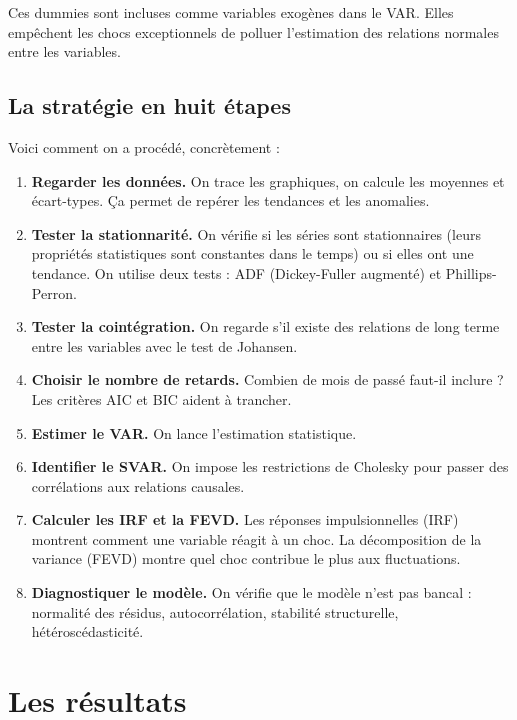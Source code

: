 \documentclass[12pt,a4paper]{article}
\begin{document}
Ces dummies sont incluses comme variables exogènes dans le VAR. Elles empêchent les chocs exceptionnels de polluer l'estimation des relations normales entre les variables.

\subsection{La stratégie en huit étapes}

Voici comment on a procédé, concrètement :

\begin{enumerate}
  \item \textbf{Regarder les données.} On trace les graphiques, on calcule les moyennes et écart-types. Ça permet de repérer les tendances et les anomalies.
  \item \textbf{Tester la stationnarité.} On vérifie si les séries sont stationnaires (leurs propriétés statistiques sont constantes dans le temps) ou si elles ont une tendance. On utilise deux tests : ADF (Dickey-Fuller augmenté) et Phillips-Perron.
  \item \textbf{Tester la cointégration.} On regarde s'il existe des relations de long terme entre les variables avec le test de Johansen.
  \item \textbf{Choisir le nombre de retards.} Combien de mois de passé faut-il inclure ? Les critères AIC et BIC aident à trancher.
  \item \textbf{Estimer le VAR.} On lance l'estimation statistique.
  \item \textbf{Identifier le SVAR.} On impose les restrictions de Cholesky pour passer des corrélations aux relations causales.
  \item \textbf{Calculer les IRF et la FEVD.} Les réponses impulsionnelles (IRF) montrent comment une variable réagit à un choc. La décomposition de la variance (FEVD) montre quel choc contribue le plus aux fluctuations.
  \item \textbf{Diagnostiquer le modèle.} On vérifie que le modèle n'est pas bancal : normalité des résidus, autocorrélation, stabilité structurelle, hétéroscédasticité.
\end{enumerate}

\section{Les résultats}
\end{document}
